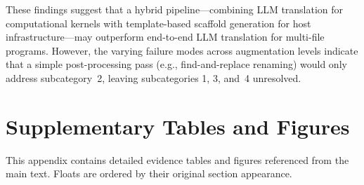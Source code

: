 These findings suggest that a hybrid pipeline---combining LLM translation for
computational kernels with template-based scaffold generation for host
infrastructure---may outperform end-to-end LLM translation for multi-file
programs. However, the varying failure modes across augmentation levels indicate
that a simple post-processing pass (e.g., find-and-replace renaming) would only
address subcategory~2, leaving subcategories 1, 3, and~4 unresolved.


\section{Supplementary Tables and Figures}
\label{sec:appendix-d}

This appendix contains detailed evidence tables and figures referenced from the main text.
Floats are ordered by their original section appearance.




